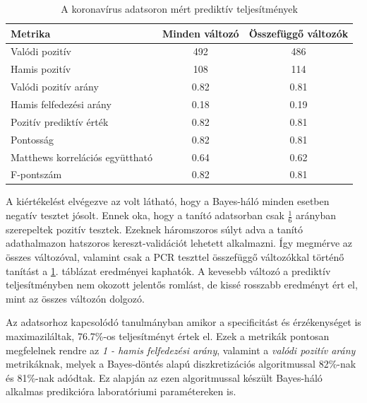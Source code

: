 \begin{table}[htp]\centering
\begin{tabular}{lcc}
    Metrika                         & Minden változó & Összefüggő változók \\ \hline
    Valódi pozitív                  & 492            & 486                 \\
    Hamis pozitív                   & 108            & 114                 \\
    Valódi pozitív arány            & 0.82           & 0.81                \\
    Hamis felfedezési arány         & 0.18           & 0.19                \\
    Pozitív prediktív érték         & 0.82           & 0.81                \\
    Pontosság                       & 0.82           & 0.81                \\
    Matthews korrelációs együttható & 0.64           & 0.62                \\
    F-pontszám                      & 0.82           & 0.81
    \end{tabular}
    \caption{A koronavírus adatsoron mért prediktív teljesítmények}
    \label{tab:covid_teljesitmeny}
\end{table}

A kiértékelést elvégezve az volt látható, hogy a Bayes-háló minden esetben negatív tesztet jósolt. Ennek oka, hogy a tanító adatsorban csak $\frac{1}{6}$ arányban szerepeltek pozitív tesztek. Ezeknek háromszoros súlyt adva a tanító adathalmazon hatszoros kereszt-validációt lehetett alkalmazni. Így megmérve az összes változóval, valamint csak a PCR teszttel összefüggő változókkal történő tanítást a \ref{tab:covid_teljesitmeny}. táblázat eredményei kaphatók. A kevesebb változó a prediktív teljesítményben nem okozott jelentős romlást, de kissé rosszabb eredményt ért el, mint az összes változón dolgozó.

Az adatsorhoz kapcsolódó tanulmányban \cite{avila2020hemogram} amikor a specificitást és érzékenységet is maximaziláltak, 76.7\%-os teljesítményt értek el. Ezek a metrikák pontosan megfelelnek rendre az \emph{1 - hamis felfedezési arány}, valamint a \emph{valódi pozitív arány} metrikáknak, melyek a Bayes-döntés alapú diszkretizációs algoritmussal 82\%-nak és 81\%-nak adódtak. Ez alapján az ezen algoritmussal készült Bayes-háló alkalmas predikcióra laboratóriumi paramétereken is.
